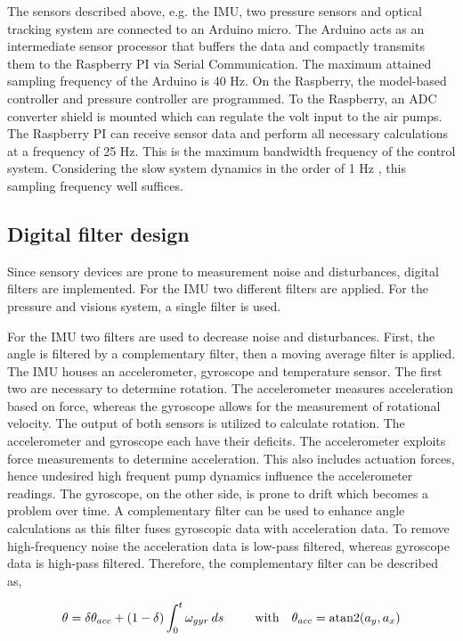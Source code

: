The sensors described above, e.g. the IMU, two pressure sensors and optical tracking system are connected to an Arduino micro. The Arduino acts as an intermediate sensor processor that buffers the data and compactly transmits them to the Raspberry PI via Serial Communication. The maximum attained sampling frequency of the Arduino is 40 Hz. On the Raspberry, the model-based controller and pressure controller are programmed. To the Raspberry, an ADC converter shield is mounted which can regulate the volt input to the air pumps. The Raspberry PI can receive sensor data and perform all necessary calculations at a frequency of 25 Hz. This is the maximum bandwidth frequency of the control system. Considering the slow system dynamics in the order of 1 Hz \cite{tawk2018bioinspired},\cite{HighBandwidthControl} this sampling frequency well suffices.


\subsection*{Digital filter design}

Since sensory devices are prone to measurement noise and disturbances, digital filters are implemented. For the IMU two different filters are applied. For the pressure and visions system, a single filter is used. 

For the IMU two filters are used to decrease noise and disturbances. First, the angle is filtered by a complementary filter, then a moving average filter is applied. The IMU houses an accelerometer, gyroscope and temperature sensor. The first two are necessary to determine rotation. The accelerometer measures acceleration based on force, whereas the gyroscope allows for the measurement of rotational velocity. The output of both sensors is utilized to calculate rotation. The accelerometer and gyroscope each have their deficits. The accelerometer exploits force measurements to determine acceleration. This also includes actuation forces, hence undesired high frequent pump dynamics influence the accelerometer readings. The gyroscope, on the other side, is prone to drift which becomes a problem over time. A complementary filter can be used to enhance angle calculations as this filter fuses gyroscopic data with acceleration data. To remove high-frequency noise the acceleration data is low-pass filtered, whereas gyroscope data is high-pass filtered. Therefore, the complementary filter can be described as, 

\begin{equation}
    \theta = \delta \theta_{acc} + (1-\delta) \int_0^t \omega_{gyr} \hspace{2pt} ds    \hspace{25pt} \text{with}  \hspace{10pt} \theta_{acc} = \operatorname{atan2}(a_y,a_x)
\end{equation}

